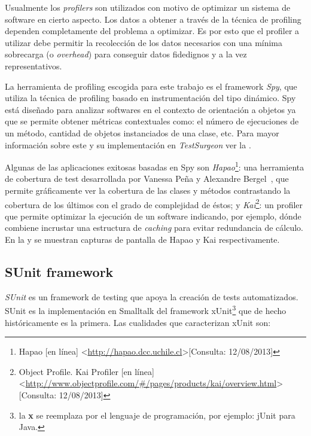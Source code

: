\par Usualmente los \emph{profilers} son utilizados con motivo de optimizar un sistema de software en cierto aspecto. Los datos a obtener a través de la técnica de profiling dependen completamente del problema a optimizar. Es por esto que el profiler a utilizar debe permitir la recolección de los datos necesarios con una mínima sobrecarga (o \emph{overhead}) para conseguir datos fidedignos y a la vez representativos. 

\par La herramienta de profiling escogida para este trabajo es el framework \emph{Spy}, que utiliza la técnica de profiling basado en instrumentación del tipo dinámico. Spy está diseñado para analizar softwares en el contexto de orientación a objetos ya que se permite obtener métricas contextuales como: el número de ejecuciones de un método, cantidad de objetos instanciados de una clase, etc. Para mayor información sobre este y su implementación en \emph{TestSurgeon} ver la . 

\par Algunas de las aplicaciones exitosas basadas en Spy son \emph{Hapao}\footnote{Hapao [en línea] \textless\url{http://hapao.dcc.uchile.cl}\textgreater  [Consulta: 12/08/2013]}: una herramienta de cobertura de test desarrollada por Vanessa Peña y Alexandre Bergel~\cite{bergel2012increasing}, que permite gráficamente ver la cobertura de las clases y métodos contrastando la cobertura de los últimos con el grado de complejidad de éstos; y \emph{Kai}\footnote{Object Profile. Kai Profiler [en línea] \textless\url{http://www.objectprofile.com/\#/pages/products/kai/overview.html}\textgreater  [Consulta: 12/08/2013] }: un profiler que permite optimizar la ejecución de un software indicando, por ejemplo, dónde combiene incrustar una estructura de \emph{caching} para evitar redundancia de cálculo. En la  y  se muestran capturas de pantalla de Hapao y Kai respectivamente.


\clearpage
\subsection{SUnit framework}

\par \emph{SUnit} es un framework de testing que apoya la creación de tests automatizados. SUnit es la implementación en Smalltalk del framework xUnit\footnote{la \textbf{x} se reemplaza por el lenguaje de programación, por ejemplo: jUnit para Java.} que de hecho históricamente es la primera. Las cualidades que caracterizan xUnit son:

